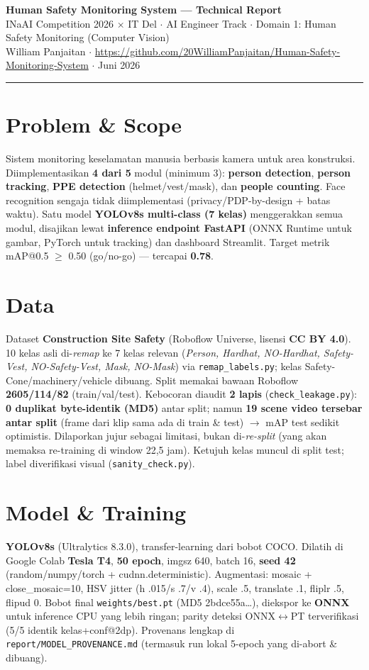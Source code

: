 \documentclass[10pt,a4paper]{article}
\newcommand{\code}[1]{\texttt{\small #1}}
\begin{document}
{\LARGE\bfseries Human Safety Monitoring System --- Technical Report}\\[2pt]
{\small INaAI Competition 2026 $\times$ IT Del $\cdot$ AI Engineer Track $\cdot$ Domain 1: Human Safety Monitoring (Computer Vision)}\\
{\small William Panjaitan $\cdot$ \url{https://github.com/20WilliamPanjaitan/Human-Safety-Monitoring-System} $\cdot$ Juni 2026}\\[-4pt]
{\color{accent}\rule{\linewidth}{0.8pt}}

\section{Problem \& Scope}
Sistem monitoring keselamatan manusia berbasis kamera untuk area konstruksi. Diimplementasikan \textbf{4 dari 5} modul (minimum 3): \textbf{person detection}, \textbf{person tracking}, \textbf{PPE detection} (helmet/vest/mask), dan \textbf{people counting}. Face recognition sengaja tidak diimplementasi (privacy/PDP-by-design + batas waktu). Satu model \textbf{YOLOv8s multi-class (7 kelas)} menggerakkan semua modul, disajikan lewat \textbf{inference endpoint FastAPI} (ONNX Runtime untuk gambar, PyTorch untuk tracking) dan dashboard Streamlit. Target metrik mAP@0.5 $\geq$ 0.50 (go/no-go) --- tercapai \textbf{0.78}.

\section{Data}
Dataset \textbf{Construction Site Safety} (Roboflow Universe, lisensi \textbf{CC BY 4.0}). 10 kelas asli di-\textit{remap} ke 7 kelas relevan (\textit{Person, Hardhat, NO-Hardhat, Safety-Vest, NO-Safety-Vest, Mask, NO-Mask}) via \code{remap\_labels.py}; kelas Safety-Cone/machinery/vehicle dibuang. Split memakai bawaan Roboflow \textbf{2605/114/82} (train/val/test). Kebocoran diaudit \textbf{2 lapis} (\code{check\_leakage.py}): \textbf{0 duplikat byte-identik (MD5)} antar split; namun \textbf{19 scene video tersebar antar split} (frame dari klip sama ada di train \& test) $\rightarrow$ mAP test sedikit optimistis. Dilaporkan jujur sebagai limitasi, bukan di-\textit{re-split} (yang akan memaksa re-training di window 22,5 jam). Ketujuh kelas muncul di split test; label diverifikasi visual (\code{sanity\_check.py}).

\section{Model \& Training}
\textbf{YOLOv8s} (Ultralytics 8.3.0), transfer-learning dari bobot COCO. Dilatih di Google Colab \textbf{Tesla T4}, \textbf{50 epoch}, imgsz 640, batch 16, \textbf{seed 42} (random/numpy/torch + cudnn.deterministic). Augmentasi: mosaic + close\_mosaic=10, HSV jitter (h .015/s .7/v .4), scale .5, translate .1, fliplr .5, flipud 0. Bobot final \code{weights/best.pt} (MD5 2bdce55a\ldots), diekspor ke \textbf{ONNX} untuk inference CPU yang lebih ringan; parity deteksi ONNX$\leftrightarrow$PT terverifikasi (5/5 identik kelas+conf@2dp). Provenans lengkap di \code{report/MODEL\_PROVENANCE.md} (termasuk run lokal 5-epoch yang di-abort \& dibuang).
\end{document}
